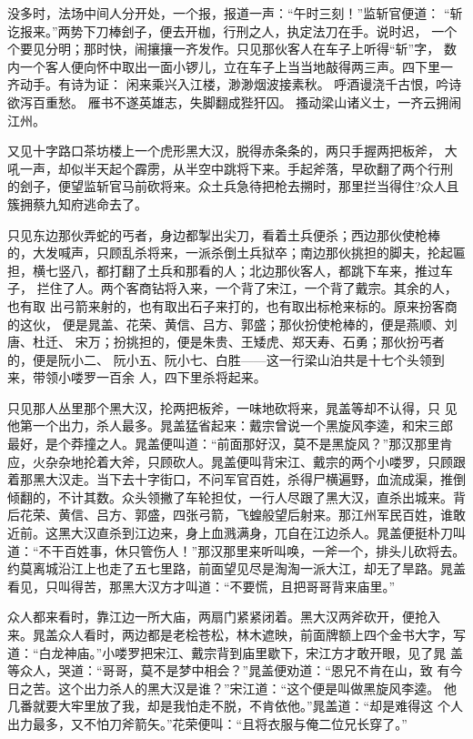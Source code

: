 没多时，法场中间人分开处，一个报，报道一声：“午时三刻！”监斩官便道：
“斩讫报来。”两势下刀棒刽子，便去开枷，行刑之人，执定法刀在手。说时迟，
一个个要见分明；那时快，闹攘攘一齐发作。只见那伙客人在车子上听得“斩”字，
数内一个客人便向怀中取出一面小锣儿，立在车子上当当地敲得两三声。四下里一
齐动手。有诗为证：
闲来乘兴入江楼，渺渺烟波接素秋。
呼酒谩浇千古恨，吟诗欲泻百重愁。
雁书不遂英雄志，失脚翻成狴犴囚。
搔动梁山诸义士，一齐云拥闹江州。

又见十字路口茶坊楼上一个虎形黑大汉，脱得赤条条的，两只手握两把板斧，
大吼一声，却似半天起个霹雳，从半空中跳将下来。手起斧落，早砍翻了两个行刑
的刽子，便望监斩官马前砍将来。众土兵急待把枪去搠时，那里拦当得住?众人且
簇拥蔡九知府逃命去了。

只见东边那伙弄蛇的丐者，身边都掣出尖刀，看着土兵便杀；西边那伙使枪棒
的，大发喊声，只顾乱杀将来，一派杀倒土兵狱卒；南边那伙挑担的脚夫，抡起匾
担，横七竖八，都打翻了土兵和那看的人；北边那伙客人，都跳下车来，推过车子，
拦住了人。两个客商钻将入来，一个背了宋江，一个背了戴宗。其余的人，也有取
出弓箭来射的，也有取出石子来打的，也有取出标枪来标的。原来扮客商的这伙，
便是晁盖、花荣、黄信、吕方、郭盛；那伙扮使枪棒的，便是燕顺、刘唐、杜迁、
宋万；扮挑担的，便是朱贵、王矮虎、郑天寿、石勇；那伙扮丐者的，便是阮小二、
阮小五、阮小七、白胜——这一行梁山泊共是十七个头领到来，带领小喽罗一百余
人，四下里杀将起来。

只见那人丛里那个黑大汉，抡两把板斧，一味地砍将来，晁盖等却不认得，只
见他第一个出力，杀人最多。晁盖猛省起来：戴宗曾说一个黑旋风李逵，和宋三郎
最好，是个莽撞之人。晁盖便叫道：“前面那好汉，莫不是黑旋风？”那汉那里肯
应，火杂杂地抡着大斧，只顾砍人。晁盖便叫背宋江、戴宗的两个小喽罗，只顾跟
着那黑大汉走。当下去十字街口，不问军官百姓，杀得尸横遍野，血流成渠，推倒
倾翻的，不计其数。众头领撇了车轮担仗，一行人尽跟了黑大汉，直杀出城来。背
后花荣、黄信、吕方、郭盛，四张弓箭，飞蝗般望后射来。那江州军民百姓，谁敢
近前。这黑大汉直杀到江边来，身上血溅满身，兀自在江边杀人。晁盖便挺朴刀叫
道：“不干百姓事，休只管伤人！”那汉那里来听叫唤，一斧一个，排头儿砍将去。
约莫离城沿江上也走了五七里路，前面望见尽是淘淘一派大江，却无了旱路。晁盖
看见，只叫得苦，那黑大汉方才叫道：“不要慌，且把哥哥背来庙里。”

众人都来看时，靠江边一所大庙，两扇门紧紧闭着。黑大汉两斧砍开，便抢入
来。晁盖众人看时，两边都是老桧苍松，林木遮映，前面牌额上四个金书大字，写
道：“白龙神庙。”小喽罗把宋江、戴宗背到庙里歇下，宋江方才敢开眼，见了晁
盖等众人，哭道：“哥哥，莫不是梦中相会？”晁盖便劝道：“恩兄不肯在山，致
有今日之苦。这个出力杀人的黑大汉是谁？”宋江道：“这个便是叫做黑旋风李逵。
他几番就要大牢里放了我，却是我怕走不脱，不肯依他。”晁盖道：“却是难得这
个人出力最多，又不怕刀斧箭矢。”花荣便叫：“且将衣服与俺二位兄长穿了。”

